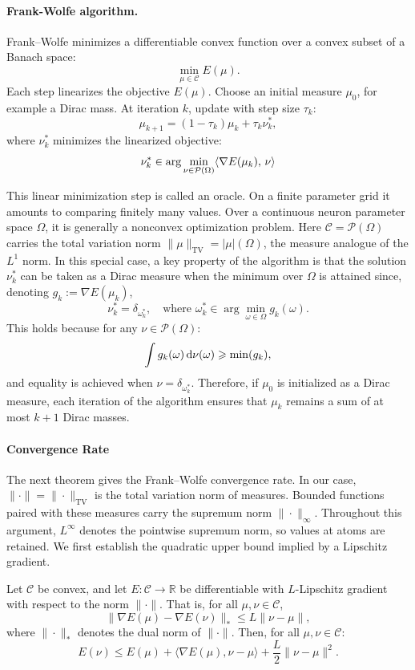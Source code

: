 \paragraph{Frank-Wolfe algorithm.}

Frank--Wolfe minimizes a differentiable convex function over a convex subset of a Banach space:
$$
	\min_{\mu \in \mathcal{C}} E(\mu).
$$
Each step linearizes the objective $E(\mu)$. %
%
Choose an initial measure $\mu_0$, for example a Dirac mass. At iteration $k$, update with step size $\tau_k$:
\[
	\mu_{k+1} = (1 - \tau_k) \mu_k + \tau_k \nu_k^*,
\]
where $\nu_k^*$ minimizes the linearized objective:
\[
	\nu_k^* \in \arg\min_{\nu \in \mathcal{P}(\Omega)} \langle \nabla E(\mu_k),\,\nu\rangle
\]

This linear minimization step is called an oracle. On a finite parameter grid it amounts to comparing finitely many values. Over a continuous neuron parameter space $\Omega$, it is generally a nonconvex optimization problem.
%
Here $\mathcal{C} = \mathcal{P}(\Omega)$ carries the total variation norm $\|\mu\|_{\mathrm{TV}} = |\mu|(\Omega)$, the measure analogue of the $L^1$ norm.
%
In this special case, a key property of the algorithm is that the solution \(\nu_k^*\) can be taken as a Dirac measure when the minimum over $\Omega$ is attained since, denoting $g_k := \nabla E(\mu_k)$,
\[
\nu_k^* = \delta_{\omega_k^*}, \quad \text{where } \omega_k^* \in \arg\min_{\omega \in \Omega} g_k(\omega).
\]
This holds because for any \(\nu \in \mathcal{P}(\Omega)\):
\[
\int g_k(\omega) \, \mathrm{d}\nu(\omega) \geqslant \min(g_k),
\]
and equality is achieved when \(\nu = \delta_{\omega_k^*}\). Therefore, if \(\mu_0\) is initialized as a Dirac measure, each iteration of the algorithm ensures that \(\mu_k\) remains a sum of at most \(k+1\) Dirac masses.

\paragraph{Convergence Rate}

The next theorem gives the Frank--Wolfe convergence rate.
%
In our case, $\|\cdot\|=\|\cdot\|_{\mathrm{TV}}$ is the total variation norm of measures. Bounded functions paired with these measures carry the supremum norm $\|\cdot\|_{\infty}$. Throughout this argument, $L^\infty$ denotes the pointwise supremum norm, so values at atoms are retained.
%
We first establish the quadratic upper bound implied by a Lipschitz gradient.

\begin{lem}\label{lem:quad-upper}
Let $\mathcal C$ be convex, and let $E: \mathcal{C} \to \mathbb{R}$ be differentiable with $L$-Lipschitz gradient with respect to the norm $\|\cdot\|$. That is, for all $\mu, \nu \in \mathcal{C}$,
\[
\|\nabla E(\mu) - \nabla E(\nu)\|_* \leq L \|\nu - \mu\|,
\]
where $\|\cdot\|_*$ denotes the dual norm of $\|\cdot\|$. Then, for all $\mu, \nu \in \mathcal{C}$:
\[
E(\nu) \leq E(\mu) + \langle \nabla E(\mu), \nu - \mu \rangle + \frac{L}{2} \|\nu - \mu\|^2.
\]
\end{lem}

